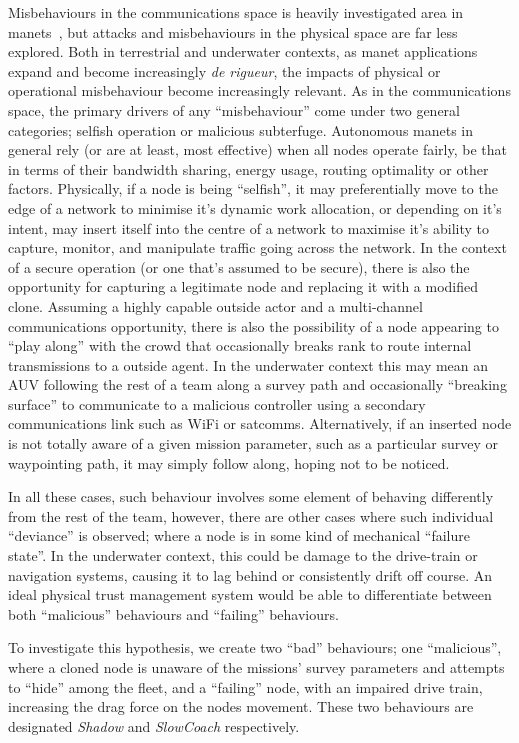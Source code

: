 Misbehaviours in the communications space is heavily investigated area in \glspl{manet}~\cite{Konate2011,Wang2009,Chen2014a,Mitchell2014}, but attacks and misbehaviours in the physical space are far less explored. 
Both in terrestrial and underwater contexts, as \gls{manet} applications expand and become increasingly \emph{de rigueur}, the impacts of physical or operational misbehaviour become increasingly relevant. 
As in the communications space, the primary drivers of any ``misbehaviour'' come under two general categories; selfish operation or malicious subterfuge.
Autonomous \glspl{manet} in general rely (or are at least, most effective) when all nodes operate fairly, be that in terms of their bandwidth sharing, energy usage, routing optimality or other factors. 
Physically, if a node is being ``selfish'', it may preferentially move to the edge of a network to minimise it's dynamic work allocation, or depending on it's intent, may insert itself into the centre of a network to maximise it's ability to capture, monitor, and manipulate traffic going across the network. 
In the context of a secure operation (or one that's assumed to be secure), there is also the opportunity for capturing a legitimate node and replacing it with a modified clone.
Assuming a highly capable outside actor and a multi-channel communications opportunity, there is also the possibility of a node appearing to ``play along'' with the crowd that occasionally breaks rank to route internal transmissions to a outside agent.
In the underwater context this may mean an AUV following the rest of a team along a survey path and occasionally ``breaking surface'' to communicate to a malicious controller using a secondary communications link such as WiFi or satcomms.
Alternatively, if an inserted node is not totally aware of a given mission parameter, such as a particular survey or waypointing path, it may simply follow along, hoping not to be noticed.

In all these cases, such behaviour involves some element of behaving differently from the rest of the team, however, there are other cases where such individual ``deviance'' is observed; where a node is in some kind of mechanical ``failure state''.
In the underwater context, this could be damage to the drive-train or navigation systems, causing it to lag behind or consistently drift off course. 
An ideal physical trust management system would be able to differentiate between both ``malicious'' behaviours and ``failing'' behaviours.

To investigate this hypothesis, we create two ``bad'' behaviours; one ``malicious'', where a cloned node is unaware of the missions' survey parameters and attempts to ``hide'' among the fleet, and a ``failing'' node, with an impaired drive train, increasing the drag force on the nodes movement.
These two behaviours are designated \emph{Shadow} and \emph{SlowCoach} respectively.
\pagebreak

